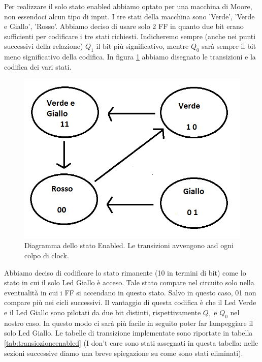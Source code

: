 \documentclass[10pt,a4paper]{article}
\begin{document}
Per realizzare il solo stato enabled abbiamo optato per una macchina di Moore, non essendoci alcun tipo di input. I tre stati della macchina sono 'Verde', 'Verde e Giallo', 'Rosso'. Abbiamo deciso di usare solo 2 FF in quanto due bit erano sufficienti per codificare i tre stati richiesti. Indicheremo sempre (anche nei punti successivi della relazione) $Q_1$ il bit più significativo, mentre $Q_0$ sarà sempre il bit meno significativo della codifica. In figura \ref{fig:FSMenabled} abbiamo disegnato le transizioni e la codifica dei vari stati.
\begin{figure}[!htb]
\centering
\includegraphics[scale=0.7]{FSMenabled.png}
\caption{Diagramma dello stato Enabled. Le transizioni avvengono aad ogni colpo di clock.\label{fig:FSMenabled}}
\end{figure}
Abbiamo deciso di codificare lo stato rimanente (10 in termini di bit) come lo stato in cui il solo Led Giallo è acceso. Tale stato compare nel circuito solo nella eventualità in cui i FF si accendano in questo stato. Salvo in questo caso, 01 non compare più nei cicli successivi.
Il vantaggio di questa codifica è che il Led Verde e il Led Giallo sono pilotati da due bit distinti, rispettivamente $Q_1$ e $Q_0$ nel nostro caso. In questo modo ci sarà più facile in seguito poter far lampeggiare il solo Led Giallo.
Le tabelle di transizione implementate sono riportate in tabella \ref{tab:transiozioneenabled} (I don't care sono stati assegnati in questa tabella: nelle sezioni successive diamo una breve spiegazione su come sono stati eliminati).
\end{document}
